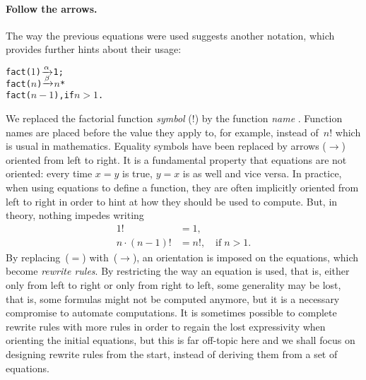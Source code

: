 \bigskip

\paragraph{Follow the arrows.}

The way the previous equations were used suggests another notation,
which provides further hints about their usage:
\begin{alltt}
fact(\(1\)) \(\xrightarrow{\smash[t]{\alpha}}\) 1;
fact(\(n\)) \(\xrightarrow{\smash[t]{\beta}}\) \(n\) *
fact(\(n-1\)), \textrm{if \(n>1\).}
\end{alltt}
We replaced the factorial function \emph{symbol} (\(!\)) by the
function \emph{name} . Function names are placed before
the value they apply to, for example,  instead
of~\(n!\) which is usual in mathematics. Equality symbols have been
replaced by arrows (\(\rightarrow\)) oriented from left to right. It
is a fundamental property that equations are not oriented: every time
\(x = y\) is true, \(y = x\) is as well and vice versa. In practice,
when using equations to define a function, they are often implicitly
oriented from left to right in order to hint at how they should be
used to compute. But, in theory, nothing impedes writing
\begin{align*}
  1! &= 1,\\
  n \cdot (n-1)! &= n!, \quad \text{if} \; n > 1.
\end{align*}
By replacing~(\(=\)) with~(\(\rightarrow\)), an orientation is imposed
on the equations, which become \emph{rewrite rules}. By restricting
the way an equation is used, that is, either only from left to right
or only from right to left, some generality may be lost, that is, some
formulas might not be computed anymore, but it is a necessary
compromise to automate computations. It is sometimes possible to
complete rewrite rules with more rules in order to regain the lost
expressivity when orienting the initial equations, but this is far
off\hyp{}topic here and we shall focus on designing rewrite rules from
the start, instead of deriving them from a set of equations.

